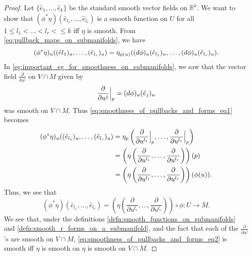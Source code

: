 \documentclass[notoc,notitlepage]{tufte-book}
\begin{document}
\begin{proof}
  Let $\{ \hat{e}_1, \ldots, \hat{e}_k \}$ be the standard smooth vector fields
  on $\mathbb{R}^k$. We want to show that $(\phi^* \eta)(\hat{e}_{l_1}, \ldots,
  \hat{e}_{l_r})$ is a smooth function on $U$ for all $1 \leq l_1 < \hdots < l_r <
  \leq k$ iff $\eta$ is smooth. From \cref{eq:pullback_maps_on_submanifolds}, we
  have
  \begin{equation}\label{eq:smoothness_of_pullbacks_and_forms_eq1}
    (\phi^* \eta)_u ((\hat{e}{l_1})_u, \ldots, (\hat{e}_{l_r})_u) =
    \eta_{\phi(u)} ((\mathop{}\!d{\phi})_u(\hat{e}_{l_1})_u, \ldots, (\mathop{}\!d{\phi})_u
    (\hat{e}_{l_r})_u).
  \end{equation}
  In \cref{eg:important_eg_for_smoothness_on_submanifolds}, we saw that the
  vector field $\frac{\partial}{\delta u^j}$ on $V \cap M$ given by
  \begin{equation*}
    \frac{\partial}{\partial u^j}\Big|_{p}^{} = (\mathop{}\!d{\phi})_u(\hat{e}_j)_u
  \end{equation*}
  was smooth on $V \cap M$. Thus \cref{eq:smoothness_of_pullbacks_and_forms_eq1}
  becomes
  \begin{align*}
    (\phi^* \eta)_u((\hat{e}_{l_1})_u, \ldots, (\hat{e}_{l_r})_u)
    &= \eta_p \left( \frac{\partial}{\partial u^{l_1}}\Big|_{p}^{}, \ldots,
    \frac{\partial}{\partial u^{l_r}}\Big|_{p}^{} \right) \\
    &= \left( \eta \left( \frac{\partial}{\partial u^{l_1}}, \ldots,
    \frac{\partial}{\partial u^{l_r}} \right) \right)(p) \\
    &= \left( \eta \left( \frac{\partial}{\partial u^{l_1}}, \ldots,
    \frac{\partial}{\partial u^{l_r}} \right) \right)(\phi(u)).
  \end{align*}
  Thus, we see that
  \begin{equation}\label{eq:smoothness_of_pullbacks_and_forms_eq2}
    (\phi^* \eta)(\hat{e}_{l_1}, \ldots, \hat{e}_{l_r}) = \left( \eta \left(
    \frac{\partial}{\partial u^{l_1}}, \ldots, \frac{\partial}{\partial u^{l_r}}
    \right) \right) \circ \phi : U \to M.
  \end{equation}
  We see that, under the definitions
  \cref{defn:smooth_functions_on_submanifolds} and
  \cref{defn:smooth_r_forms_on_a_submanifold}, and the fact that each of the
  $\frac{\partial}{\partial u^j}$'s are smooth on $V \cap M$,
  \cref{eq:smoothness_of_pullbacks_and_forms_eq2} is smooth iff $\eta$ is smooth
  on $\eta$ is smooth on $V \cap M$.
\end{proof}
\end{document}
